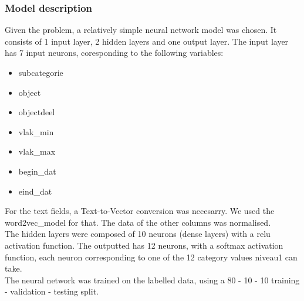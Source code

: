 \subsubsection{Model description}
Given the problem, a relatively simple neural network model was chosen. It consists of 1 input layer, 2 hidden layers and one output layer. The input layer has 7 input neurons, coresponding to the following variables:
\begin{itemize}
    \item subcategorie
    \item object
    \item objectdeel
    \item vlak\_min
    \item vlak\_max
    \item begin\_dat
    \item eind\_dat
\end{itemize}
For the text fields, a Text-to-Vector conversion was necesarry. We used the word2vec\_model for that. The data of the other columns was normalised. \\
The hidden layers were composed of 10 neurons (dense layers) with a relu activation function. The outputted has 12 neurons, with a softmax activation function, each neuron corresponding to one of the 12 category values niveau1 can take. \\ 
The neural network was trained on the labelled data, using a 80 - 10 - 10 training - validation - testing split.
